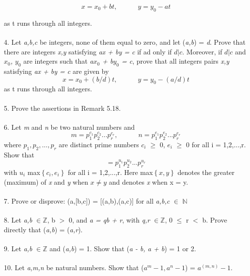 \documentclass[11pt]{amsbook}
\begin{document}
\begin{equation*}
x = x_{0} + bt,\quad  \quad  \quad  	y = y_{0} - at
\end{equation*}

as t runs through all integers.
\\ \\
4. Let \textit{a,b,c} be integers, none of them equal to zero, and let (\textit{a,b}) = \textit{d}.
Prove that there are integers \textit{x,y} satisfying \textit{ax + by = c} if ad only if $d|c$.
Moreover, if $d|c$ and \textit{$x_{0}$, $y_{0}$} are integers such that \textit{a$x_{0}$ + b$y_{0}$ = c}, prove that
all integers pairs \textit{x,y} satisfying \textit{ax + by = c} are given by
\begin{equation*}
x = x_0 + (b/d)t, \quad  \quad  \quad    y = y_0 - (a/d)t
\end{equation*}
as t runs through all integers. 
\\ \\
5. Prove the assertions in Remark 5.18.
\\ \\
6. Let  \textit{m} and  \textit{n} be two natural numbers and 
\begin{equation*}
m = p_1^{c_1}p_2^{c_2}...p_r^{c_r},  \quad  \quad  \quad n = p_1^{e_1}p_2^{e_2}...p_r^{e_r}
\end{equation*}
where $p_1,p_2,...,p_r$ are distinct prime numbers $c_i$ $\geq$ 0, $e_i$ $\geq$ 0 for all
i = 1,2,...,r. Show that 
\begin{equation*}
[m,n] = p_1^{u_1}p_2^{u_2}...p_r^{u_r}
\end{equation*}
with $u_i$ max$\left \{ c_i,e_i\right \}$ for all i = 1,2,...,r. Here max$\left \{ x,y\right \}$ denotes the greater (maximum) 
of \textit{x} and \textit{y} when $x \neq y$ and denotes \textit{x} when x = y. 
\\ \\
7. Prove or disprove: (a,[b,c]) = [(a,b),(a,c)] for all \textit{a,b,c} $\in$ $\mathbb{N}$ 
\\ \\
8. Let \textit{a,b} $\in \mathbb{Z}$, b $>$ 0, and \textit{a = qb + r}, with \textit{q,r} $\in \mathbb{Z}$, 0 $\leq$ r $<$ b. Prove
directly that (\textit{a,b}) = (\textit{a,r}).
\\ \\
9. Let  \textit{a,b} $\in \mathbb{Z}$ and (\textit{a,b}) = 1. Show that (\textit{a - b, a + b}) = 1 or 2.
\\ \\
10. Let \textit{a,m,n} be natural numbers. Show that ($a^m - 1, a^n -1$) = $a^{(m,n)} - 1$.
\end{document}
